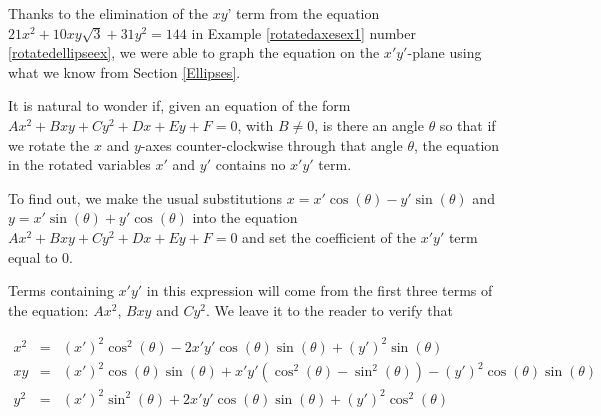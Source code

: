 \documentclass{ximera}
\begin{document}
\begin{example}
\begin{explanation}
\begin{enumerate}
\begin{image}
\end{image}



\end{enumerate}

\end{explanation}

\end{example}

Thanks to the elimination of  the $xy$' term from the equation $21x^2+10xy\sqrt{3}+31y^2=144$ in  Example \ref{rotatedaxesex1} number \ref{rotatedellipseex}, we   were able to graph the equation on the $x'y'$-plane using what we know from Section \ref{Ellipses}. 

 It is natural to wonder if, given an equation of the form $Ax^2 + Bxy +Cy^2 + Dx + Ey + F = 0$, with $B \neq 0$, is there an angle $\theta$ so that if we rotate the $x$ and $y$-axes counter-clockwise through that angle $\theta$, the equation in the rotated  variables $x'$ and $y'$ contains no $x'y'$ term.
 

  To find out, we make the usual substitutions  $x = x' \cos(\theta) - y' \sin(\theta)$ and  $y =  x'\sin(\theta) + y'\cos(\theta)$ into the equation $Ax^2 + Bxy +Cy^2 + Dx + Ey + F = 0$ and set the coefficient of the $x'y'$ term equal to $0$.  
  

  Terms containing $x'y'$ in this expression will come from the first three terms of the equation: $Ax^2$, $Bxy$ and $Cy^2$.  We leave it to the reader to verify that 

\[ \begin{array}{rcl}



x^2 & = &(x')^2 \cos^{2}(\theta) - 2x'y'\cos(\theta) \sin(\theta) + (y')^2 \sin(\theta) \\  


xy & = &  (x')^2\cos(\theta) \sin(\theta)+ x'y' \left(\cos^{2}(\theta)-\sin^2(\theta)\right)-(y')^2\cos(\theta)\sin(\theta) \\  


y^2 & = & (x')^2 \sin^{2}(\theta) +2x'y' \cos(\theta) \sin(\theta) +(y')^2 \cos^{2}(\theta) \\

\end{array} \]
\end{document}
